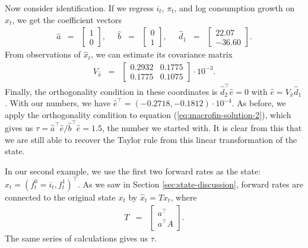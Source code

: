 \documentclass[11pt]{article}
\begin{document}
{Now consider identification.
If we regress $i_t$, $\pi_t$, and log consumption growth on $\hat{x}_t$,
we get the coefficient vectors
\begin{eqnarray*}
    \hat{a} &=&
    \left[
        \begin{array}{r}
        1 \\ 0
        \end{array}
    \right] ,
    \;\;\;\;\;
    \hat{b} \;\;=\;\;
    \left[
        \begin{array}{r}
        0 \\ 1
        \end{array}
    \right] ,
        \;\;\;\;\;
    \hat{d}_1 \;\;=\;\;
    \left[
        \begin{array}{r}
         22.07 \\  -36.60
        \end{array}
    \right] .
\end{eqnarray*}
From observations of $\hat{x}_t$, we can estimate its covariance matrix
\begin{eqnarray*}
    V_{\hat{x}} &=&
       \left[
        \begin{array}{rr}
         0.2932 &   0.1775 \\  0.1775  &  0.1075
        \end{array}
        \right] \cdot 10^{-3} .
\end{eqnarray*}
Finally, the orthogonality condition in these coordinates
is $\hat{d}_2^{\top} \hat{e} = 0$ with $\hat{e} = V_{\hat{x}} \hat{d}_1 $.
With our numbers, we have $\hat{e}^\top = (-0.2718, -0.1812) \cdot 10^{-4}$.
%
As before, we apply the orthogonality condition to
equation (\ref{eq:macrofin-solution-2}), which gives us
$\tau = \hat{a}^{\top} \hat{e} / \hat{b}^{\top} \hat{e} = 1.5 $,
the number we started with.
It is clear from this that we are still able to recover the Taylor rule
from this linear transformation of the state.


In our second example, we use the first two forward rates as the state:
$\hat{x}_t = (f_t^0=i_t, f_t^1)^\top$.
As we saw in Section \ref{sec:state-discussion},
forward rates are connected to the original state $x_t$ by
$\hat{x}_t = T x_t$, where
\begin{eqnarray*}
    T &=&
        \left[
        \begin{array}{c}
        a^\top \\ a^\top A
        \end{array}
        \right] .
\end{eqnarray*}
The same series of calculations gives us $\tau$.



}
\end{document}
